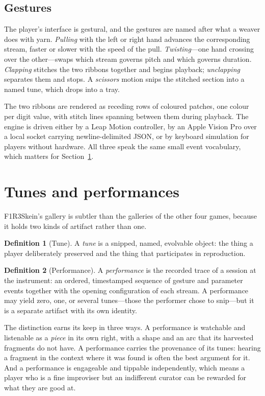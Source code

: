 \documentclass[11pt,a4paper]{article}
\theoremstyle{definition}
\newtheorem{definition}{Definition}
\theoremstyle{plain}
\begin{document}
\subsection{Gestures}

The player's interface is gestural, and the gestures are named after what a weaver does with yarn.
\emph{Pulling} with the left or right hand advances the corresponding stream, faster or slower with
the speed of the pull. \emph{Twisting}---one hand crossing over the other---swaps which stream
governs pitch and which governs duration. \emph{Clapping} stitches the two ribbons together and
begins playback; \emph{unclapping} separates them and stops. A \emph{scissors} motion snips the
stitched section into a named tune, which drops into a tray.

The two ribbons are rendered as receding rows of coloured patches, one colour per digit value, with
stitch lines spanning between them during playback. The engine is driven either by a Leap Motion
controller, by an Apple Vision Pro over a local socket carrying newline-delimited JSON, or by
keyboard simulation for players without hardware. All three speak the same small event vocabulary,
which matters for Section~\ref{sec:performances}.

\section{Tunes and performances}
\label{sec:performances}

F1R3Skein's gallery is subtler than the galleries of the other four games, because it holds two
kinds of artifact rather than one.

\begin{definition}[Tune]
A \emph{tune} is a snipped, named, evolvable object: the thing a player deliberately preserved and
the thing that participates in reproduction.
\end{definition}

\begin{definition}[Performance]
A \emph{performance} is the recorded trace of a session at the instrument: an ordered, timestamped
sequence of gesture and parameter events together with the opening configuration of each stream. A
performance may yield zero, one, or several tunes---those the performer chose to snip---but it is a
separate artifact with its own identity.
\end{definition}

The distinction earns its keep in three ways. A performance is watchable and listenable as a
\emph{piece} in its own right, with a shape and an arc that its harvested fragments do not have. A
performance carries the provenance of its tunes: hearing a fragment in the context where it was
found is often the best argument for it. And a performance is engageable and tippable
independently, which means a player who is a fine improviser but an indifferent curator can be
rewarded for what they are good at.
\end{document}
